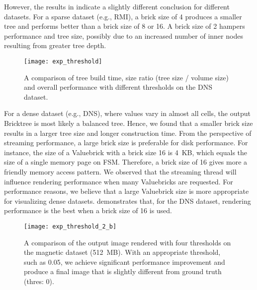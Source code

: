 However, the results in  indicate a slightly
different conclusion for different datasets. For a sparse dataset (e.g., RMI),
a brick size of 4 produces a smaller tree and performs better than a brick size of 8 or 16.
A brick size of 2 hampers performance and tree size, possibly due to an increased number of
inner nodes resulting from greater tree depth. 

\begin{figure}[t]
    \centering
    \texttt{[image: exp\_threshold]}
    \vspace{-2em}
	\caption{\label{fig:exp_threshold}%
	A comparison of tree build time, size ratio (tree size / volume size) and overall performance with different thresholds on the DNS dataset.}
	\vspace{-0.5em}
\end{figure}


For a dense dataset (e.g., DNS), where values vary in almost all cells,
the output Bricktree is most likely a balanced tree. Hence, we found that
a smaller brick size results in a larger tree size and longer construction time.
From the perspective of streaming performance, a large brick size is preferable 
for disk performance. For instance, the size of a Valuebrick with a
brick size 16 is 4~KB, which equals the size of a single memory page on FSM. 
Therefore, a brick size of 16 gives more a friendly memory access pattern. 
We observed that the streaming thread will influence rendering performance
when many Valuebricks are requested. For performance reasons, we believe that a 
large Valuebrick size is more appropriate for visualizing dense datasets. 
 demonstrates that, for the DNS dataset, rendering
performance is the best when a brick size of 16 is used. 


\begin{figure*}[t]
    \centering
    \texttt{[image: exp\_threshold\_2\_b]}
	\caption{\label{fig:exp_threshold_2}%
	A comparison of the output image rendered with four thresholds on the magnetic dataset (512~MB).
	With an appropriate threshold, such as 0.05, we achieve significant performance improvement and produce a final image that is slightly different from ground truth (thres: 0).
	}
\end{figure*}

